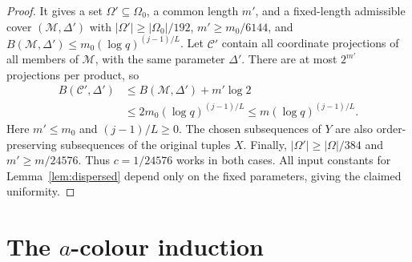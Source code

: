 \documentclass[11pt,a4paper]{article}
\numberwithin{equation}{section}
\newcommand{\cC}{\mathcal C}
\begin{document}
\begin{proof}
It gives a set $\Omega'\subseteq\Omega_0$, a common length
$m'$, and a fixed-length admissible cover $(\mathcal M,\Delta')$
with
$|\Omega'|\ge|\Omega_0|/192$,
$m'\ge m_0/6144$, and
$B(\mathcal M,\Delta')\le m_0(\log q)^{(j-1)/L}$.
Let $\cC'$ contain all coordinate projections of all members
of $\mathcal M$, with the same parameter $\Delta'$.
There are at most $2^{m'}$ projections per product, so
\[
 \begin{aligned}
 B(\cC',\Delta')
 &\le B(\mathcal M,\Delta')+m'\log2\\
 &\le2m_0(\log q)^{(j-1)/L}
 \le m(\log q)^{(j-1)/L}.
 \end{aligned}
\]
Here $m'\le m_0$ and $(j-1)/L\ge0$.
The chosen subsequences of $Y$ are also order-preserving
subsequences of the original tuples $X$.
Finally,
$|\Omega'|\ge|\Omega|/384$ and $m'\ge m/24576$.
Thus $c=1/24576$ works in both cases.
All input constants for Lemma~\ref{lem:dispersed} depend only
on the fixed parameters, giving the claimed uniformity.
\end{proof}

\section{The \texorpdfstring{$a$}{a}-colour induction}
\label{sec:induction}
\end{document}
